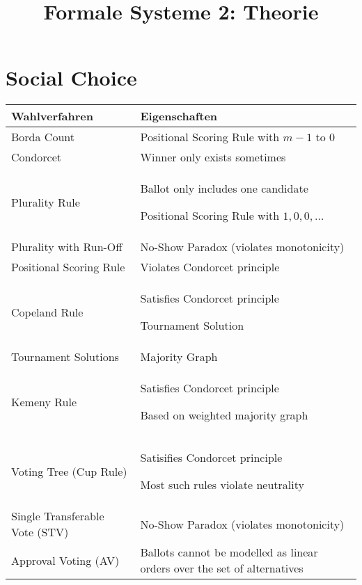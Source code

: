 \documentclass[11pt]{scrartcl}
\title{Formale Systeme 2: Theorie}
\date{\vspace{-5ex}}
\begin{document}
\maketitle

\section{Social Choice}

\begin{xltabular}{\linewidth}{p{60mm}p{80mm}}
    \textbf{Wahlverfahren} &
    \textbf{Eigenschaften} \\ \hline
    
    Borda Count &
    Positional Scoring Rule with $m-1$ to $0$ \\ \hline

    Condorcet &
    Winner only exists sometimes \\ \hline

    Plurality Rule &
    Ballot only includes one candidate
    
    Positional Scoring Rule with $1, 0, 0, \dots$ \\ \hline

    Plurality with Run-Off &
    No-Show Paradox (violates monotonicity) \\ \hline

    Positional Scoring Rule &
    Violates Condorcet principle \\ \hline

    Copeland Rule &
    Satisfies Condorcet principle
    
    Tournament Solution \\ \hline

    Tournament Solutions &
    Majority Graph \\ \hline

    Kemeny Rule &
    Satisfies Condorcet principle
    
    Based on weighted majority graph \\ \hline

    Voting Tree (Cup Rule) &
    Satisifies Condorcet principle

    Most such rules violate neutrality \\ \hline

    Single Transferable Vote (STV) &
    No-Show Paradox (violates monotonicity) \\ \hline

    Approval Voting (AV) &
    Ballots cannot be modelled as linear orders over the set of alternatives \\ \hline


\end{xltabular}
\end{document}
